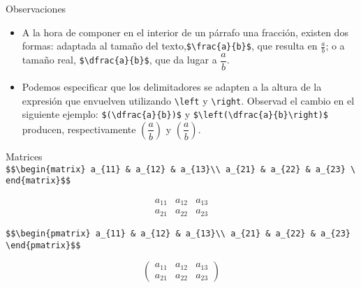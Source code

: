 \documentclass[
  ignorenonframetext,
]{beamer}
\begin{document}
\begin{frame}[fragile]{Observaciones}
\protect\hypertarget{observaciones}{}
\begin{itemize}
\item
  A la hora de componer en el interior de un párrafo una fracción,
  existen dos formas: adaptada al tamaño del
  texto,\texttt{\$\textbackslash{}frac\{a\}\{b\}\$}, que resulta en
  \(\frac{a}{b}\); o a tamaño real,
  \texttt{\$\textbackslash{}dfrac\{a\}\{b\}\$}, que da lugar a
  \(\dfrac{a}{b}\).
\item
  Podemos especificar que los delimitadores se adapten a la altura de la
  expresión que envuelven utilizando \texttt{\textbackslash{}left} y
  \texttt{\textbackslash{}right}. Observad el cambio en el siguiente
  ejemplo: \texttt{\$(\textbackslash{}dfrac\{a\}\{b\})\$} y
  \texttt{\$\textbackslash{}left(\textbackslash{}dfrac\{a\}\{b\}\textbackslash{}right)\$}
  producen, respectivamente \((\dfrac{a}{b})\) y
  \(\left(\dfrac{a}{b}\right)\).
\end{itemize}
\end{frame}

\begin{frame}[fragile]{Matrices}
\protect\hypertarget{matrices}{}
\texttt{\$\$\textbackslash{}begin\{matrix\}\ a\_\{11\}\ \&\ a\_\{12\}\ \&\ a\_\{13\}\textbackslash{}\textbackslash{}\ a\_\{21\}\ \&\ a\_\{22\}\ \&\ a\_\{23\}\ \textbackslash{}end\{matrix\}\$\$}

\[\begin{matrix}
a_{11} & a_{12} & a_{13}\\
a_{21} & a_{22} & a_{23}
\end{matrix}\]

\texttt{\$\$\textbackslash{}begin\{pmatrix\}\ a\_\{11\}\ \&\ a\_\{12\}\ \&\ a\_\{13\}\textbackslash{}\textbackslash{}\ a\_\{21\}\ \&\ a\_\{22\}\ \&\ a\_\{23\}\ \textbackslash{}end\{pmatrix\}\$\$}

\[\begin{pmatrix}
a_{11} & a_{12} & a_{13}\\
a_{21} & a_{22} & a_{23}
\end{pmatrix}\]
\end{frame}
\end{document}
